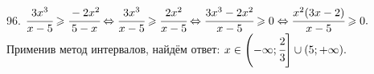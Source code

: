 96. $\cfrac{3x^3}{x-5}\geqslant\cfrac{-2x^2}{5-x}\Leftrightarrow\cfrac{3x^3}{x-5}\geqslant\cfrac{2x^2}{x-5}\Leftrightarrow
\cfrac{3x^3-2x^2}{x-5}\geqslant0\Leftrightarrow\cfrac{x^2(3x-2)}{x-5}\geqslant0.$ Применив метод интервалов, найдём ответ: $x\in\left(-\infty;\cfrac{2}{3}\right]
\cup(5;+\infty).$
\begin{figure}[ht!]
\end{figure}\\
